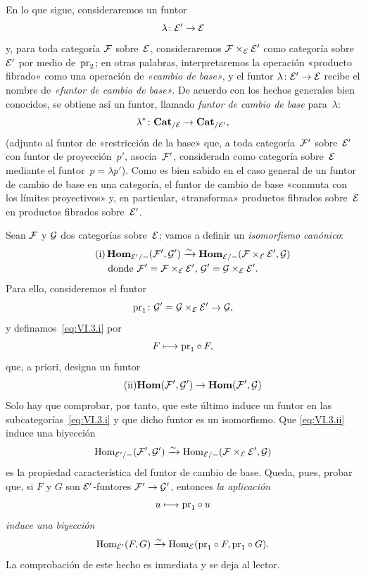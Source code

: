 En lo que sigue, consideraremos un funtor
$$
\lambda\colon\cal{E}'\to\cal{E}
$$
y, para toda categoría $\cal{F}$ sobre~$\cal{E}$, consideraremos
$\cal{F}\times_\cal{E}\cal{E}'$ como categoría sobre~$\cal{E}'$ por medio
de~$\pr_2$; en otras palabras, interpretaremos la operación «producto fibrado»
como una operación de \emph{«cambio de base»}, y el funtor
$\lambda\colon\cal{E}'\to\cal{E}$ recibe el nombre de \emph{«funtor de cambio
de base»}.
%
%
De acuerdo con los hechos generales bien conocidos, se obtiene así un funtor,
llamado
\emph{funtor de cambio de base} para~$\lambda$:
$$
\lambda^*\colon\Cat_{/\cal{E}}\to\Cat_{/\cal{E}'}\quoi,
$$
\label{indnot:fl}%
(adjunto al funtor de «restricción de la base» que, a toda categoría~$\cal{F}'$
sobre~$\cal{E}'$ con funtor de proyección~$p'$, asocia~$\cal{F}'$, considerada
como categoría sobre~$\cal{E}$ mediante el funtor~$p=\lambda p'$). Como es bien
sabido en el caso general de un funtor de cambio de base en una categoría, el
funtor de cambio de base «conmuta con los límites proyectivos» y, en particular,
«transforma» productos fibrados sobre~$\cal{E}$ en productos fibrados
sobre~$\cal{E}'$.

Sean $\cal{F}$ y $\cal{G}$ dos categorías sobre~$\cal{E}$; vamos a definir un
\emph{isomorfismo canónico}:
\begin{multline*}
\label{eq:VI.3.i}
\tag{i}
\SheafHom_{\cal{E}'/-}(\cal{F}',\cal{G}')\isomto
\SheafHom_{\cal{E}/-}(\cal{F}\times_{\cal{E}}\cal{E}',\cal{G})\\
\text{donde }\cal{F}'=\cal{F}\times_{\cal{E}}\cal{E}'\text{, }
\cal{G}'=\cal{G}\times_{\cal{E}}\cal{E}'.
\end{multline*}
Para ello, consideremos el funtor
$$
\pr_1\colon\cal{G}'=\cal{G}\times_{\cal{E}}\cal{E}'\to\cal{G}\quoi,
$$
y definamos~\eqref{eq:VI.3.i} por
$$
F\mto\pr_1\circ F\quoi,
$$
que, a priori, designa un funtor
\begin{equation*}
\label{eq:VI.3.ii}
\tag{ii} {\SheafHom(\cal{F}',\cal{G}')\to\SheafHom(\cal{F}',\cal{G})}
\end{equation*}
Solo hay que comprobar, por tanto, que este último induce un funtor en las
subcategorías~\eqref{eq:VI.3.i} y que dicho funtor es un isomorfismo. Que
\eqref{eq:VI.3.ii} induce una biyección
$$
\Hom_{\cal{E}'/-}(\cal{F}',\cal{G}')\isomto
\Hom_{\cal{E}/-}(\cal{F}\times_{\cal{E}}\cal{E}',\cal{G})
$$
es la propiedad característica del funtor de cambio de base. Queda, pues,
probar que, si $F$ y $G$ son $\cal{E}'$-funtores
$\cal{F}'\to\cal{G}'$, entonces \emph{la aplicación}
$$
u\mto\pr_1\circ u
$$
\emph{induce una biyección}
$$
\Hom_{\cal{E}'}(F,G)\isomto\Hom_{\cal{E}}(\pr_1\circ F,\pr_1\circ
G)\quoi.
$$
La comprobación de este hecho es inmediata y se deja al lector.

